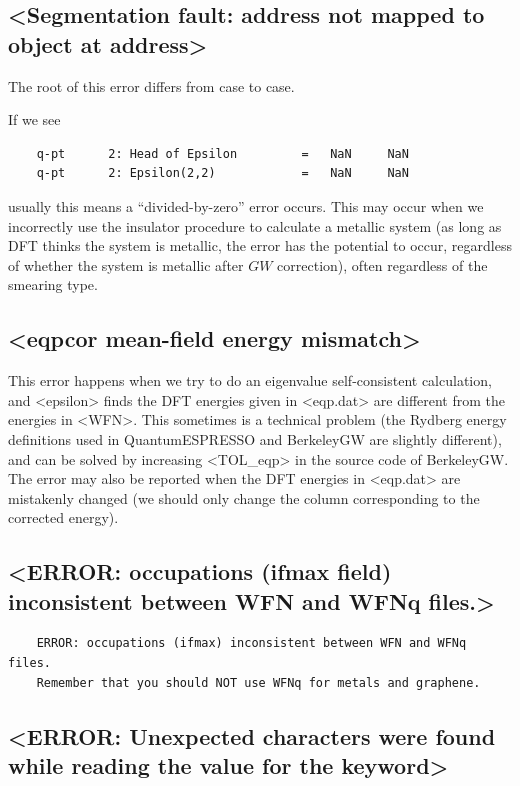 \documentclass[hyperref, a4paper]{report}
\def\texttt#1{<#1>}%
\newcommand{\shortcode}[1]{\texttt{#1}}
\begin{document}
\subsection{\shortcode{Segmentation fault: address not mapped to object at address}}\label{sec:segment-fault-1}

The root of this error differs from case to case.

If we see 
\begin{lstlisting}
    q-pt      2: Head of Epsilon         =   NaN     NaN    
    q-pt      2: Epsilon(2,2)            =   NaN     NaN    
\end{lstlisting}
usually this means a ``divided-by-zero'' error occurs.
This may occur when we incorrectly use the insulator procedure to calculate a metallic system 
(as long as DFT thinks the system is metallic, the error has the potential to occur,
regardless of whether the system is metallic after $GW$ correction),
often regardless of the smearing type. 

\subsection{\shortcode{eqpcor mean-field energy mismatch}}

This error happens when we try to do an eigenvalue self-consistent calculation,
and \shortcode{epsilon} finds the DFT energies given in \shortcode{eqp.dat} 
are different from the energies in \shortcode{WFN}.
This sometimes is a technical problem 
(the Rydberg energy definitions used in QuantumESPRESSO and BerkeleyGW are slightly different),
and can be solved by increasing \shortcode{TOL_eqp} in the source code of BerkeleyGW.
The error may also be reported 
when the DFT energies in \shortcode{eqp.dat} are mistakenly changed
(we should only change the column corresponding to the corrected energy).


\subsection{\shortcode{ERROR: occupations (ifmax field) inconsistent between WFN and WFNq files.}}

\begin{lstlisting}
    ERROR: occupations (ifmax) inconsistent between WFN and WFNq files.
    Remember that you should NOT use WFNq for metals and graphene.  
\end{lstlisting}

\subsection{\shortcode{ERROR: Unexpected characters were found while reading the value for the keyword}}
\end{document}
